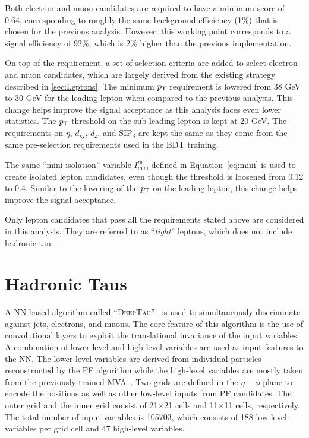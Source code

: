 Both electron and muon candidates are required to have a minimum \TOP score of 0.64, corresponding to roughly the same background efficiency (1\%) that is chosen for the previous analysis. However, this working point corresponds to a signal efficiency of 92\%, which is 2\% higher than the previous implementation.

On top of the \TOP requirement, a set of selection criteria are added to select electron and muon candidates, which are largely derived from the existing strategy described in \autoref{sec:Leptons}. The minimum $p_{\textsf{T}}$ requirement is lowered from 38 GeV to 30 GeV for the leading lepton when compared to the previous analysis. This change helps improve the signal acceptance as this analysis faces even lower statistics. The $p_{\textsf{T}}$ threshold on the sub-leading lepton is kept at 20 GeV. The requirements on $\eta$, $d_{\textsf{xy}}$, $d_{\textsf{z}}$, and SIP$_3$ are kept the same as they come from the same pre-selection requirements used in the \ac{BDT} training. 

The same ``mini isolation'' variable $I^{\textsf{rel}}_{\textsf{mini}}$ defined in Equation~\ref{eq:mini} is used to create isolated lepton candidates, even though the threshold is loosened from 0.12 to 0.4. Similar to the lowering of the $p_{\textsf{T}}$ on the leading lepton, this change helps improve the signal acceptance.

Only lepton candidates that pass all the requirements stated above are considered in this analysis. They are referred to as ``\emph{tight}'' leptons, which does not include hadronic tau.

\section{Hadronic Taus}
\label{sec:Taus}

A \ac{NN}-based algorithm called ``\textsc{DeepTau}''~\cite{CMS:2022prd} is used to simultaneously discriminate
against jets, electrons, and muons. The core feature of this algorithm is the use of convolutional layers to exploit the translational invariance of the input variables. A combination of lower-level and high-level variables are used as input features to the \ac{NN}. The lower-level variables are derived from individual particles reconstructed by the \ac{PF} algorithm while the high-level variables are mostly taken from the previously trained \ac{MVA}~\cite{CMS:2015pac}. Two grids are defined in the $\eta-\phi$ plane to encode the positions as well as other low-level inputs from \ac{PF} candidates. The outer grid and the inner grid consist of 21$\times$21 cells and 11$\times$11 cells, respectively. The total number of input variables is 105703, which consists of 188 low-level variables per grid cell and 47 high-level variables.

